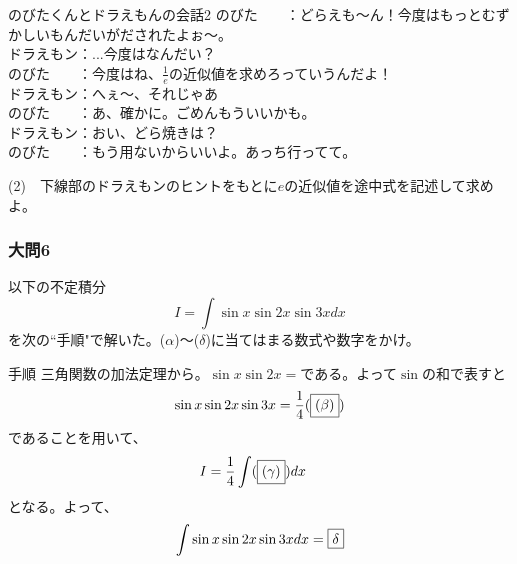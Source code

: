\documentclass[a4j,dvipdfmx]{jsarticle}
\begin{document}
    \begin{itembox}[c]{のびたくんとドラえもんの会話2}
        のびた　　：どらえも～ん！今度はもっとむずかしいもんだいがだされたよぉ～。\\
        ドラえもン：...今度はなんだい？\\
        のびた　　：今度はね、$\frac{1}{e}$の近似値を求めろっていうんだよ！\\
        ドラえもン：へぇ～、それじゃあ\\
        のびた　　：あ、確かに。ごめんもういいかも。\\
        ドラえもン：おい、どら焼きは？\\
        のびた　　：もう用ないからいいよ。あっち行ってて。
    \end{itembox}
    (2)　下線部のドラえもンのヒントをもとに$e$の近似値を途中式を記述して求めよ。
    \newpage
    \subsubsection*{大問6}
    以下の不定積分
    \begin{equation*}
        I=\int \sin x\sin 2x\sin 3xdx
    \end{equation*}
    を次の``手順"で解いた。($\alpha$)～($\delta$)に当てはまる数式や数字をかけ。
    \begin{itembox}{手順}
        三角関数の加法定理から。$\sin x\sin 2x=$\fbox{$(\alpha)$}である。よって$\sin$の和で表すと
        \begin{equation*}
            \sin x\sin 2x\sin 3x=\frac{1}{4}(\fbox{\text{($\beta$)}})
        \end{equation*}
        であることを用いて、
        \begin{align*}
            I&=\frac{1}{4}\int (\fbox{$(\gamma)$})dx
        \end{align*}
        となる。よって、
        \begin{equation*}
            \int \sin x\sin 2x\sin 3xdx=\fbox{$\delta$}
        \end{equation*}
    \end{itembox}
    \\
\end{document}
